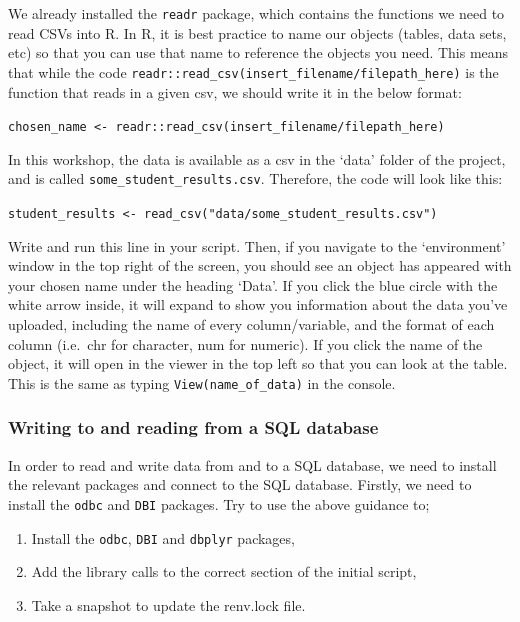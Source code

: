 \documentclass[
  12pt,
]{article}
\begin{document}
We already installed the \texttt{readr} package, which contains the
functions we need to read CSVs into R. In R, it is best practice to name
our objects (tables, data sets, etc) so that you can use that name to
reference the objects you need. This means that while the code
\texttt{readr::read\_csv(insert\_filename/filepath\_here)} is the
function that reads in a given csv, we should write it in the below
format:

\texttt{chosen\_name\ \textless{}-\ readr::read\_csv(insert\_filename/filepath\_here)}

In this workshop, the data is available as a csv in the `data' folder of
the project, and is called \texttt{some\_student\_results.csv}.
Therefore, the code will look like this:

\texttt{student\_results\ \textless{}-\ read\_csv("data/some\_student\_results.csv")}

Write and run this line in your script. Then, if you navigate to the
`environment' window in the top right of the screen, you should see an
object has appeared with your chosen name under the heading `Data'. If
you click the blue circle with the white arrow inside, it will expand to
show you information about the data you've uploaded, including the name
of every column/variable, and the format of each column (i.e.~chr for
character, num for numeric). If you click the name of the object, it
will open in the viewer in the top left so that you can look at the
table. This is the same as typing \texttt{View(name\_of\_data)} in the
console.

\hypertarget{writing-to-and-reading-from-a-sql-database}{%
\subsubsection{Writing to and reading from a SQL
database}\label{writing-to-and-reading-from-a-sql-database}}

In order to read and write data from and to a SQL database, we need to
install the relevant packages and connect to the SQL database. Firstly,
we need to install the \texttt{odbc} and \texttt{DBI} packages. Try to
use the above guidance to;

\begin{enumerate}
\def\labelenumi{\alph{enumi}.}
\item
  Install the \texttt{odbc}, \texttt{DBI} and \texttt{dbplyr} packages,
\item
  Add the library calls to the correct section of the initial script,
\item
  Take a snapshot to update the renv.lock file.
\end{enumerate}
\end{document}
